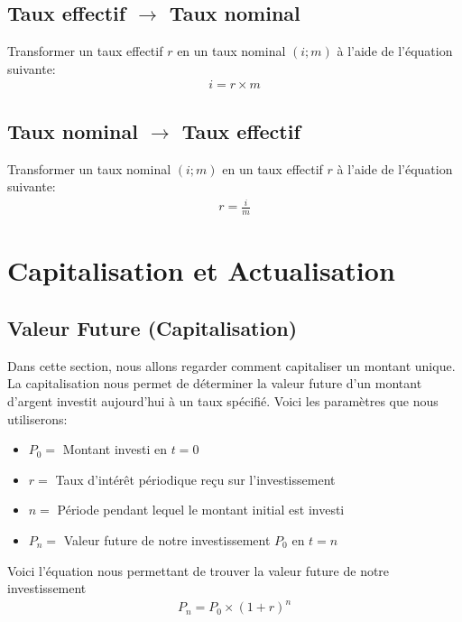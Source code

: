\documentclass[12pt]{article}
\begin{document}
\subsection{Taux effectif $\rightarrow$ Taux nominal}
Transformer un taux effectif $r$ en un taux nominal $(i;m)$ à l'aide de l'équation suivante:
\begin{align*}
i = r \times m
\end{align*}

\subsection{Taux nominal $\rightarrow$ Taux effectif}
Transformer un taux nominal $(i;m)$ en un taux effectif $r$ à l'aide de l'équation suivante:
\begin{align*}
r=\frac{i}{m}
\end{align*}

\pagebreak \newpage

\section{Capitalisation et Actualisation}
\subsection{Valeur Future (Capitalisation)}
Dans cette section, nous allons regarder comment capitaliser un montant unique. La capitalisation nous permet de déterminer la valeur future d'un montant d'argent investit aujourd'hui à un taux spécifié. Voici les paramètres que nous utiliserons:
\begin{itemize}
\item $P_0=$ Montant investi en $t=0$ 
\item $r=$ Taux d'intérêt périodique reçu sur l'investissement
\item $n=$ Période pendant lequel le montant initial est investi
\item $P_n=$ Valeur future de notre investissement $P_0$ en $t=n$
\end{itemize}

Voici l'équation nous permettant de trouver la valeur future de notre investissement 
\begin{align*}
P_n=P_0 \times (1+r)^n
\end{align*}
\end{document}
